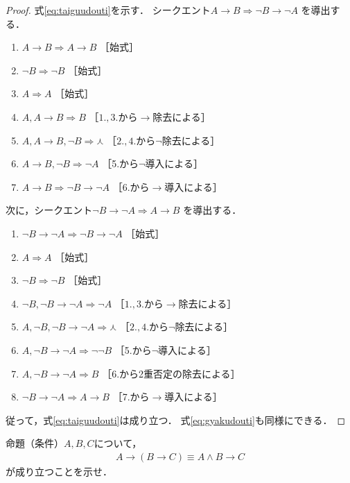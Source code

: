    \begin{proof}
     式\eqref{eq:taiguudouti}を示す．
     シークエント$A \to B \Longrightarrow \lnot B \to \lnot A$
     を導出する．
     \begin{enumerate}[1. ]
       \item $A \to B \Longrightarrow A \to B$ \quad ［始式］
       \item $\lnot B \Longrightarrow \lnot B$ \quad ［始式］
       \item $A \Longrightarrow A $ \quad ［始式］
       \item $A,  A \to B \Longrightarrow B$ \quad ［$1., 3.$から$\to$除去による］
       \item $A,  A \to B ,  \lnot B \Longrightarrow \curlywedge$
              \quad ［$2., 4.$から$\lnot$除去による］
       \item $A \to B ,  \lnot B \Longrightarrow \lnot A$ \quad ［5.から$\lnot$導入による］
       \item $A \to B \Longrightarrow \lnot B \to \lnot A$ \quad ［6.から$\to$導入による］
     \end{enumerate}
     次に，シークエント$\lnot B \to \lnot A \Longrightarrow A \to B$
     を導出する．
     \begin{enumerate}[1. ]
       \item $\lnot B \to \lnot A \Longrightarrow \lnot B \to \lnot A$
              \quad ［始式］
       \item $A \Longrightarrow A $ \quad ［始式］
       \item $\lnot B \Longrightarrow \lnot B$ \quad ［始式］
       \item $\lnot B ,  \lnot B \to \lnot A \Longrightarrow \lnot A$
              \quad ［$1., 3.$から$\to$除去による］
       \item $A,  \lnot B ,  \lnot B \to \lnot A \Longrightarrow \curlywedge$
              \quad ［$2., 4.$から$\lnot$除去による］
       \item $A ,  \lnot B \to \lnot A \Longrightarrow \lnot \lnot B $
              \quad ［5.から$\lnot$導入による］
       \item $A ,  \lnot B \to \lnot A \Longrightarrow B $
              \quad ［6.から2重否定の除去による］
       \item $\lnot B \to \lnot A \Longrightarrow A \to B$
              \quad ［7.から$\to$導入による］
     \end{enumerate}
     従って，式\eqref{eq:taiguudouti}は成り立つ．
     式\eqref{eq:gyakudouti}も同様にできる．
   \end{proof}
   \begin{que} \label{que:tototo}
     命題（条件）$A,  B,  C$について，
     \begin{align}
       A \to ( B \to C) \equiv A \land B \to C
       \label{eq:tototo}
     \end{align}
     が成り立つことを示せ．
   \end{que}

